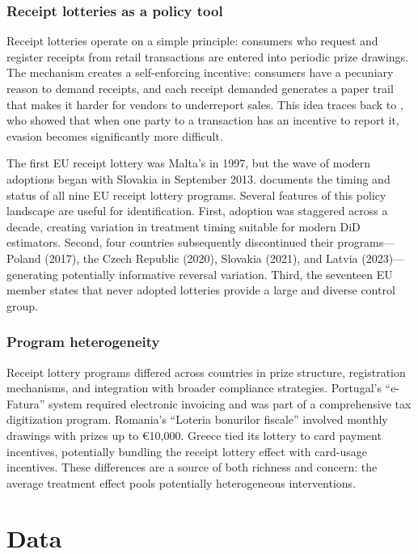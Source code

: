 \documentclass[12pt]{article}
\begin{document}
\subsubsection*{Receipt lotteries as a policy tool} Receipt lotteries operate on a simple principle: consumers who request and register receipts from retail transactions are entered into periodic prize drawings. The mechanism creates a self-enforcing incentive: consumers have a pecuniary reason to demand receipts, and each receipt demanded generates a paper trail that makes it harder for vendors to underreport sales. This idea traces back to \citet{Gordon1990}, who showed that when one party to a transaction has an incentive to report it, evasion becomes significantly more difficult.

The first EU receipt lottery was Malta's in 1997, but the wave of modern adoptions began with Slovakia in September 2013.  documents the timing and status of all nine EU receipt lottery programs. Several features of this policy landscape are useful for identification. First, adoption was staggered across a decade, creating variation in treatment timing suitable for modern DiD estimators. Second, four countries subsequently discontinued their programs---Poland (2017), the Czech Republic (2020), Slovakia (2021), and Latvia (2023)---generating potentially informative reversal variation. Third, the seventeen EU member states that never adopted lotteries provide a large and diverse control group.

\subsubsection*{Program heterogeneity} Receipt lottery programs differed across countries in prize structure, registration mechanisms, and integration with broader compliance strategies. Portugal's ``e-Fatura'' system required electronic invoicing and was part of a comprehensive tax digitization program. Romania's ``Loteria bonurilor fiscale'' involved monthly drawings with prizes up to \euro{}10,000. Greece tied its lottery to card payment incentives, potentially bundling the receipt lottery effect with card-usage incentives. These differences are a source of both richness and concern: the average treatment effect pools potentially heterogeneous interventions.


\section{Data}
\end{document}

